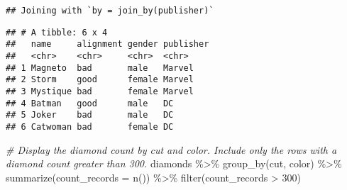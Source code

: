 \documentclass[
]{article}
\newenvironment{Shaded}{\begin{snugshade}}{\end{snugshade}}
\newcommand{\AttributeTok}[1]{\textcolor[rgb]{0.77,0.63,0.00}{#1}}
\newcommand{\CommentTok}[1]{\textcolor[rgb]{0.56,0.35,0.01}{\textit{#1}}}
\newcommand{\DecValTok}[1]{\textcolor[rgb]{0.00,0.00,0.81}{#1}}
\newcommand{\FunctionTok}[1]{\textcolor[rgb]{0.00,0.00,0.00}{#1}}
\newcommand{\NormalTok}[1]{#1}
\newcommand{\SpecialCharTok}[1]{\textcolor[rgb]{0.00,0.00,0.00}{#1}}
\begin{document}
\begin{Shaded}
\end{Shaded}

\begin{verbatim}
## Joining with `by = join_by(publisher)`
\end{verbatim}

\begin{verbatim}
## # A tibble: 6 x 4
##   name     alignment gender publisher
##   <chr>    <chr>     <chr>  <chr>    
## 1 Magneto  bad       male   Marvel   
## 2 Storm    good      female Marvel   
## 3 Mystique bad       female Marvel   
## 4 Batman   good      male   DC       
## 5 Joker    bad       male   DC       
## 6 Catwoman bad       female DC
\end{verbatim}

\begin{Shaded}
\end{Shaded}

\begin{Shaded}
\begin{Highlighting}[]
\CommentTok{\# Display the diamond count by cut and color. Include only the rows with a diamond count greater than 300.}
\NormalTok{diamonds }\SpecialCharTok{\%\textgreater{}\%}
  \FunctionTok{group\_by}\NormalTok{(cut, color) }\SpecialCharTok{\%\textgreater{}\%}
  \FunctionTok{summarize}\NormalTok{(}\AttributeTok{count\_records =} \FunctionTok{n}\NormalTok{()) }\SpecialCharTok{\%\textgreater{}\%}
  \FunctionTok{filter}\NormalTok{(count\_records }\SpecialCharTok{\textgreater{}} \DecValTok{300}\NormalTok{)}
\end{Highlighting}
\end{Shaded}
\end{document}
